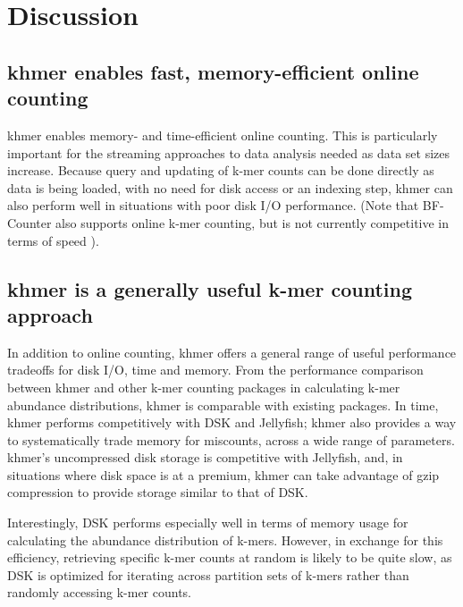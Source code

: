 \documentclass{article}
\begin{document}

\section{Discussion}

\subsection{khmer enables fast, memory-efficient online counting}

khmer enables memory- and time-efficient online counting.  This is
particularly important for the streaming approaches to data analysis
needed as data set sizes increase.  Because query and updating of
k-mer counts can be done directly as data is being loaded, with no
need for disk access or an indexing step, khmer can also perform
well in situations with poor disk I/O performance.  (Note that BF-Counter
also supports online k-mer counting, but is not currently competitive
in terms of speed \cite{Deorowicz2013}).

\subsection{khmer is a generally useful k-mer counting approach}

In addition to online counting, khmer offers a general range of useful
performance tradeoffs for disk I/O, time and memory.  From the
performance comparison between khmer and other k-mer counting packages
in calculating k-mer abundance distributions, khmer is comparable with
existing packages.  In time, khmer performs competitively with DSK and
Jellyfish; khmer also provides a way to systematically trade memory
for miscounts, across a wide range of parameters.  khmer's
uncompressed disk storage is competitive with Jellyfish, and, in
situations where disk space is at a premium, khmer can take advantage
of gzip compression to provide storage similar to that of DSK.

Interestingly, DSK performs especially well in terms of memory usage
for calculating the abundance distribution of k-mers. However, in
exchange for this efficiency, retrieving specific k-mer counts at
random is likely to be quite slow, as DSK is optimized for iterating
across partition sets of k-mers rather than randomly accessing k-mer
counts.
\end{document}
